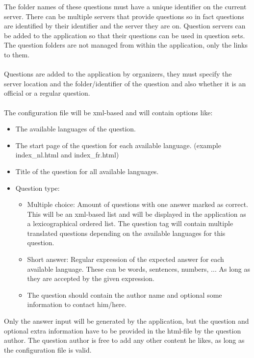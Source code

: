 	The folder names of these questions must have a unique identifier on the current
	server. There can be multiple servers that provide questions so in fact questions
	are identified by their identifier and the server they are on. Question servers can be
	added to the application so that their questions can be used in question sets. The
	question folders are not managed from within the application, only the links to them.
	\\
	\\
	Questions are added to the application by organizers, they must specify the server
	location and the folder/identifier of the question and also whether it is an official
	or a regular question. 
	\\
	\\
	The configuration file will be xml-based and will contain options like:
	\begin{itemize}
		\item The available languages of the question.
		\item The start page of the question for each available language.
		(example index\_nl.html and index\_fr.html)
  		\item Title of the question for all available languages.
  		\item Question type:
  		\begin{itemize}
  			\item Multiple choice: Amount of questions with one answer marked as correct.
  			This will be an xml-based list and will be displayed in the application as a
  			lexicographical ordered list.
  			The question tag will contain multiple translated questions depending on the
  			available languages for this question.
  			\item Short answer: Regular expression of the expected answer for each
  			available language. These can be words, sentences, numbers, ... As long as
  			they are accepted by the given expression.
  			\item The question should contain the author name and optional some information to contact him/here.
  		\end{itemize}
	\end{itemize}
	Only the answer input will be generated by the application, but the question and
	optional extra information have to be provided in the html-file by the question author.
	The question author is free to add any other content he likes, as long as the
	configuration file is valid. \\
	\\
